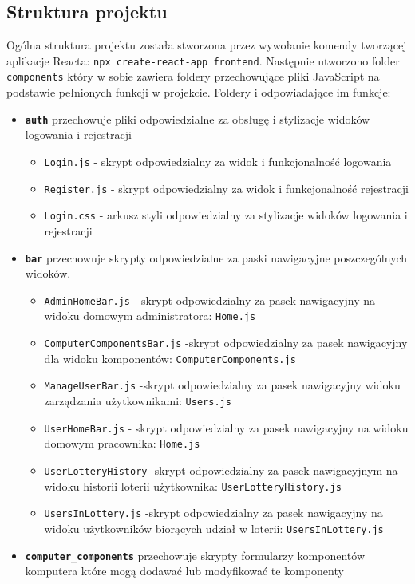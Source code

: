 \subsection{Struktura projektu}
Ogólna struktura projektu została stworzona przez wywołanie komendy tworzącej aplikacje Reacta: \texttt{npx create-react-app frontend}. Następnie utworzono folder \texttt{components} który w sobie zawiera foldery przechowujące pliki JavaScript na podstawie pełnionych funkcji w projekcie. Foldery i odpowiadające im funkcje: 
\begin {itemize}
\item \texttt{\textbf{auth}} przechowuje pliki odpowiedzialne za obsługę i stylizacje widoków logowania i rejestracji
	\begin{itemize}
	\item \texttt{Login.js} - skrypt odpowiedzialny za widok i funkcjonalność logowania
	\item \texttt{Register.js} - skrypt odpowiedzialny za widok i funkcjonalność rejestracji
	\item \texttt{Login.css} - arkusz styli odpowiedzialny za stylizacje widoków logowania i rejestracji
	\end{itemize}
\item \texttt{\textbf{bar}} przechowuje skrypty odpowiedzialne za paski nawigacyjne poszczególnych widoków.
	\begin{itemize}
	\item \texttt{AdminHomeBar.js} - skrypt odpowiedzialny za pasek nawigacyjny na widoku domowym administratora: \texttt{Home.js}
	\item \texttt{ComputerComponentsBar.js} -skrypt odpowiedzialny za pasek nawigacyjny dla widoku komponentów: \texttt{ComputerComponents.js}
	\item \texttt{ManageUserBar.js} -skrypt odpowiedzialny za pasek nawigacyjny widoku zarządzania użytkownikami: \texttt{Users.js}
	\item \texttt{UserHomeBar.js} - skrypt odpowiedzialny za pasek nawigacyjny na widoku domowym pracownika: \texttt{Home.js}
	\item \texttt{UserLotteryHistory} -skrypt odpowiedzialny za pasek nawigacyjnym na widoku historii loterii użytkownika: \texttt{UserLotteryHistory.js}
	\item \texttt{UsersInLottery.js} -skrypt odpowiedzialny za pasek nawigacyjny na widoku użytkowników biorących udział w loterii: \texttt{UsersInLottery.js}
	\end{itemize}
\item \texttt{\textbf{computer\_components}} przechowuje skrypty formularzy komponentów komputera które mogą dodawać lub modyfikować te komponenty

\end{itemize}
